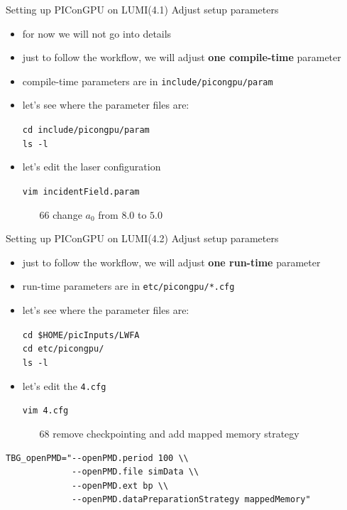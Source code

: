 \documentclass[
  aspectratio=169,
  10pt
]{beamer}
\newcommand{\terminal}[1]{\par\noindent\colorbox{shadecolor}
{\parbox{\dimexpr\textwidth-2\fboxsep\relax}{\texttt{#1}}}}
\begin{document}
\begin{frame}[t,fragile]{Setting up PIConGPU on LUMI}{(4.1) Adjust setup parameters}

\begin{itemize}
    \item for now we will not go into details
    \item just to follow the workflow, we will adjust \textbf{one compile-time} parameter
    \item compile-time parameters are in \texttt{include/picongpu/param}
    \item let's see where the parameter files are:
    \terminal{cd include/picongpu/param \\
    ls -l}
    \item let's edit the laser configuration
    \terminal{vim incidentField.param}
    \begin{enumerate}
        \item[66] change $a_0$ from $8.0$ to $5.0$ 
    \end{enumerate}

\end{itemize}

\end{frame}




\begin{frame}[t,fragile]{Setting up PIConGPU on LUMI}{(4.2) Adjust setup parameters}

\begin{itemize}
    \item just to follow the workflow, we will adjust \textbf{one run-time} parameter
    \item run-time parameters are in \texttt{etc/picongpu/*.cfg}
    \item let's see where the parameter files are:
    \terminal{cd \$HOME/picInputs/LWFA \\ 
    cd etc/picongpu/ \\
    ls -l}
    \item let's edit the \texttt{4.cfg}
    \terminal{vim 4.cfg}
    \begin{enumerate}
        \item[68] remove checkpointing and add mapped memory strategy
    \end{enumerate}
\end{itemize}


\begin{verbatim}
TBG_openPMD="--openPMD.period 100 \\
             --openPMD.file simData \\
             --openPMD.ext bp \\
             --openPMD.dataPreparationStrategy mappedMemory"
\end{verbatim}



\end{frame}
\end{document}
